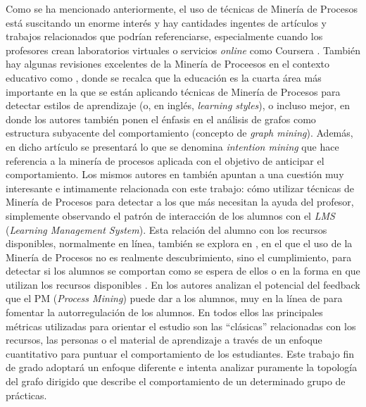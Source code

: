 Como se ha mencionado anteriormente, el uso de técnicas de Minería de Procesos está suscitando un enorme interés y hay cantidades ingentes de artículos y trabajos relacionados que podrían referenciarse, especialmente cuando los profesores crean laboratorios virtuales \cite{Elmoazen_2023} o servicios \emph{online} como Coursera \cite{mukala2015learning}. También hay algunas revisiones excelentes de la Minería de Proceesos en el contexto educativo como \cite{dos2019process}, donde se recalca que la educación es la cuarta área más importante en la que se están aplicando técnicas de Minería de Procesos para detectar estilos de aprendizaje (o, en inglés, \emph{learning styles}), o incluso mejor, en \cite{bogarin2018survey} donde los autores también ponen el énfasis en el análisis de grafos como estructura subyacente del comportamiento (concepto de \emph{graph mining}). Además, en dicho artículo se presentará lo que se denomina \emph{intention mining} que hace referencia a la minería de procesos aplicada con el objetivo de anticipar el comportamiento. Los mismos autores en \cite{bogarin2018discovering} también apuntan a una cuestión muy interesante e intimamente relacionada con este trabajo: cómo utilizar técnicas de Minería de Procesos para detectar a los que más necesitan la ayuda del profesor, simplemente observando el patrón de interacción de los alumnos con el \emph{LMS} (\emph{Learning Management System}). Esta relación del alumno con los recursos disponibles, normalmente en línea, también se explora en \cite{mukala2015learning}, en el que el uso de la Minería de Procesos no es realmente descubrimiento, sino el cumplimiento, para detectar si los alumnos se comportan como se espera de ellos o en la forma en que utilizan los recursos disponibles \cite{juhavnak2019using}. En \cite{sedrakyan2016process} los autores analizan el potencial del
feedback que el PM (\emph{Process Mining}) puede dar a los alumnos, muy en la línea de \citep{Keller_1968} para fomentar la autorregulación de los alumnos. En todos ellos las principales métricas utilizadas para orientar el estudio son las ``clásicas'' relacionadas con los recursos, las personas o el material de aprendizaje a través de un enfoque cuantitativo para puntuar el comportamiento de los estudiantes. Este trabajo fin de grado adoptará un enfoque diferente e intenta analizar puramente la topología del grafo dirigido que describe el comportamiento de un determinado grupo de prácticas.

